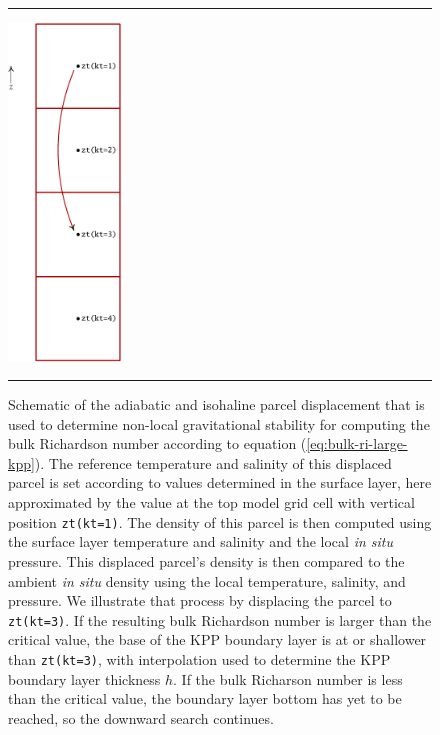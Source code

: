 \begin{figure}[h!t]
\rule{\textwidth}{0.005in}
\begin{center}
\includegraphics[angle=0,width=3cm]{./mfpic_figs/cvmix_stability_nonlocal.pdf}
\caption[Determining non-local gravitational stability]{\sf Schematic
  of the adiabatic and isohaline parcel displacement that is used to
  determine non-local gravitational stability for computing the bulk
  Richardson number according to equation
  (\ref{eq:bulk-ri-large-kpp}).  The reference temperature and
  salinity of this displaced parcel is set according to values
  determined in the surface layer, here approximated by the value at
  the top model grid cell with vertical position {\tt zt(kt=1)}.  The
  density of this parcel is then computed using the surface layer
  temperature and salinity and the local {\it in situ} pressure.  This
  displaced parcel's density is then compared to the ambient {\it in
    situ} density using the local temperature, salinity, and pressure.
  We illustrate that process by displacing the parcel to {\tt
    zt(kt=3)}.  If the resulting bulk Richardson number is larger than
  the critical value, the base of the KPP boundary layer is at or
  shallower than {\tt zt(kt=3)}, with interpolation used to determine
  the KPP boundary layer thickness $h$.  If the bulk Richarson number
  is less than the critical value, the boundary layer bottom has yet
  to be reached, so the downward search continues.}
\label{fig:cvmix_stability_nonlocal}
\end{center}
\rule{\textwidth}{0.005in}
\end{figure}

